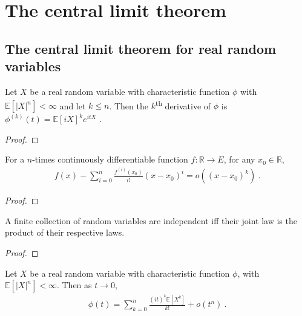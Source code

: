 \chapter{The central limit theorem}

\section{The central limit theorem for real random variables}

\begin{lemma}\label{lem:deriv_charFun}
\leanok
{}
Let $X$ be a real random variable with characteristic function $\phi$ with $\mathbb{E}[\vert X \vert^n] < \infty$ and let $k \le n$.
Then the $k$\textsuperscript{th} derivative of $\phi$ is
$\phi^{(k)}(t) = \mathbb{E}[i X]^k e^{i t X}$ \: .
\end{lemma}

\begin{proof}\leanok
{}
\end{proof}

\begin{lemma}\label{lem:taylor_peano}
\mathlibok
{}
For a $n$-times continuously differentiable function $f : \mathbb{R} \to E$, for any $x_0\in\mathbb{R}$,
\begin{align*}
f(x) - \sum_{i=0}^n\frac{f^{(i)}(x_0)}{i!}(x-x_0)^i = o((x - x_0)^k)
\: .
\end{align*}
\end{lemma}

\begin{proof}\leanok
\end{proof}

\begin{lemma}\label{lem:iIndepFun_iff_pi_map_eq_map}
\mathlibok
{}
A finite collection of random variables are independent iff their joint law is the product of their respective laws.
\end{lemma}

\begin{proof}\leanok
\end{proof}

\begin{lemma}\label{lem:charFun_taylor}
\leanok
{}
Let $X$ be a real random variable with characteristic function $\phi$, with $\mathbb{E}[\vert X \vert^n] < \infty$. Then as $t \to 0$,
\begin{align*}
\phi(t) = \sum_{k=0}^n \frac{(it)^k \mathbb{E}[X^k]}{k!} + o(t^n)
\: .
\end{align*}
\end{lemma}


